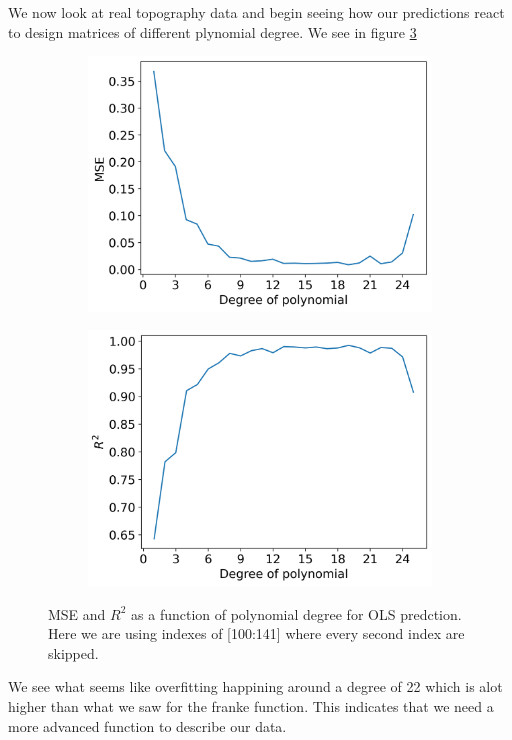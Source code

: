 \documentclass[12pt]{article}
\begin{document}
We now look at real topography data and begin seeing how our predictions react to design matrices of different plynomial degree. We see in figure \ref{fig:mse_r2_real}
\begin{figure}[H]
  \begin{subfigure}{.5\textwidth}
    \centering
    \includegraphics[width=\textwidth]{../figures/mse_deg_real.png}
    \caption{}
    \label{fig:}
  \end{subfigure}
  \begin{subfigure}{.5\textwidth}
    \centering
    \includegraphics[width=\textwidth]{../figures/r2_deg_real.png}
    \caption{}
    \label{fig:}
  \end{subfigure}
  \caption{MSE and $R^2$ as a function of polynomial degree for OLS predction. Here we are using indexes of [100:141] where every second index are skipped.}
  \label{fig:mse_r2_real}
\end{figure}
We see what seems like overfitting happining around a degree of 22 which is alot higher than what we saw for the franke function. This indicates that we need a more advanced function to describe our data.
\end{document}

